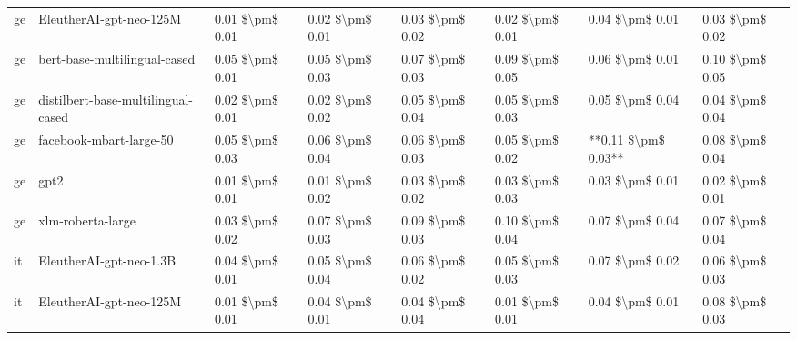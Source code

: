 \begin{tabular}{llllllll}
      ge &            EleutherAI-gpt-neo-125M & 0.01 \$\textbackslash pm\$ 0.01 &           0.02 \$\textbackslash pm\$ 0.01 &       0.03 \$\textbackslash pm\$ 0.02 &        0.02 \$\textbackslash pm\$ 0.01 &                         0.04 \$\textbackslash pm\$ 0.01 &     0.03 \$\textbackslash pm\$ 0.02 \\
      ge &       bert-base-multilingual-cased & 0.05 \$\textbackslash pm\$ 0.01 &           0.05 \$\textbackslash pm\$ 0.03 &       0.07 \$\textbackslash pm\$ 0.03 &        0.09 \$\textbackslash pm\$ 0.05 &                         0.06 \$\textbackslash pm\$ 0.01 &     0.10 \$\textbackslash pm\$ 0.05 \\
      ge & distilbert-base-multilingual-cased & 0.02 \$\textbackslash pm\$ 0.01 &           0.02 \$\textbackslash pm\$ 0.02 &       0.05 \$\textbackslash pm\$ 0.04 &        0.05 \$\textbackslash pm\$ 0.03 &                         0.05 \$\textbackslash pm\$ 0.04 &     0.04 \$\textbackslash pm\$ 0.04 \\
      ge &            facebook-mbart-large-50 & 0.05 \$\textbackslash pm\$ 0.03 &           0.06 \$\textbackslash pm\$ 0.04 &       0.06 \$\textbackslash pm\$ 0.03 &        0.05 \$\textbackslash pm\$ 0.02 &                     **0.11 \$\textbackslash pm\$ 0.03** &     0.08 \$\textbackslash pm\$ 0.04 \\
      ge &                               gpt2 & 0.01 \$\textbackslash pm\$ 0.01 &           0.01 \$\textbackslash pm\$ 0.02 &       0.03 \$\textbackslash pm\$ 0.02 &        0.03 \$\textbackslash pm\$ 0.03 &                         0.03 \$\textbackslash pm\$ 0.01 &     0.02 \$\textbackslash pm\$ 0.01 \\
      ge &                  xlm-roberta-large & 0.03 \$\textbackslash pm\$ 0.02 &           0.07 \$\textbackslash pm\$ 0.03 &       0.09 \$\textbackslash pm\$ 0.03 &        0.10 \$\textbackslash pm\$ 0.04 &                         0.07 \$\textbackslash pm\$ 0.04 &     0.07 \$\textbackslash pm\$ 0.04 \\
      it &            EleutherAI-gpt-neo-1.3B & 0.04 \$\textbackslash pm\$ 0.01 &           0.05 \$\textbackslash pm\$ 0.04 &       0.06 \$\textbackslash pm\$ 0.02 &        0.05 \$\textbackslash pm\$ 0.03 &                         0.07 \$\textbackslash pm\$ 0.02 &     0.06 \$\textbackslash pm\$ 0.03 \\
      it &            EleutherAI-gpt-neo-125M & 0.01 \$\textbackslash pm\$ 0.01 &           0.04 \$\textbackslash pm\$ 0.01 &       0.04 \$\textbackslash pm\$ 0.04 &        0.01 \$\textbackslash pm\$ 0.01 &                         0.04 \$\textbackslash pm\$ 0.01 &     0.08 \$\textbackslash pm\$ 0.03 \\

\end{tabular}
